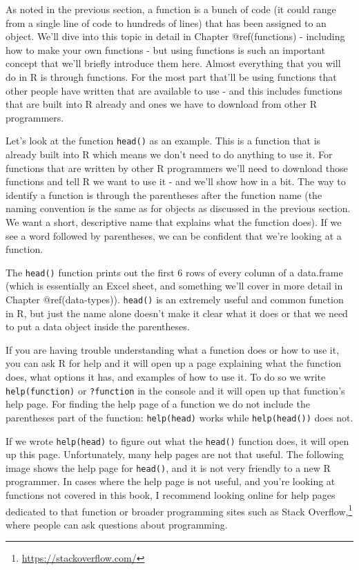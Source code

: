 \documentclass[
  a4paper,
]{krantz}
\renewcommand{\href}[2]{#2\footnote{\url{#1}}}
\begin{document}
As noted in the previous section, a function is a bunch of
code (it could range from a single line of code to hundreds
of lines) that has been assigned to an object. We'll dive
into this topic in detail in Chapter @ref(functions) -
including how to make your own functions - but using
functions is such an important concept that we'll briefly
introduce them here. Almost everything that you will do in R
is through functions. For the most part that'll be using
functions that other people have written that are available
to use - and this includes functions that are built into R
already and ones we have to download from other R
programmers.

Let's look at the function \texttt{head()} as an example.
This is a function that is already built into R which means
we don't need to do anything to use it. For functions that
are written by other R programmers we'll need to download
those functions and tell R we want to use it - and we'll
show how in a bit. The way to identify a function is through
the parentheses after the function name (the naming
convention is the same as for objects as discussed in the
previous section. We want a short, descriptive name that
explains what the function does). If we see a word followed
by parentheses, we can be confident that we're looking at a
function.

The \texttt{head()} function prints out the first 6 rows of
every column of a data.frame (which is essentially an Excel
sheet, and something we'll cover in more detail in Chapter
@ref(data-types)). \texttt{head()} is an extremely useful
and common function in R, but just the name alone doesn't
make it clear what it does or that we need to put a data
object inside the parentheses.

If you are having trouble understanding what a function does
or how to use it, you can ask R for help and it will open up
a page explaining what the function does, what options it
has, and examples of how to use it. To do so we write
\texttt{help(function)} or \texttt{?function} in the console
and it will open up that function's help page. For finding
the help page of a function we do not include the
parentheses part of the function: \texttt{help(head)} works
while \texttt{help(head())} does not.

If we wrote \texttt{help(head)} to figure out what the
\texttt{head()} function does, it will open up this page.
Unfortunately, many help pages are not that useful. The
following image shows the help page for \texttt{head()}, and
it is not very friendly to a new R programmer. In cases
where the help page is not useful, and you're looking at
functions not covered in this book, I recommend looking
online for help pages dedicated to that function or broader
programming sites such as
\href{https://stackoverflow.com/}{Stack Overflow,} where
people can ask questions about programming.
\end{document}
